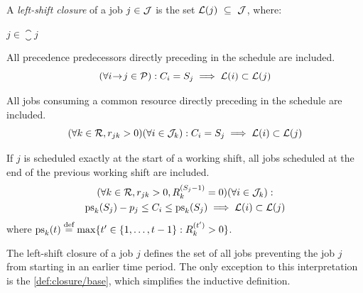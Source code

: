 \begin{defn} \label{def:left-shift-closure}
    A \emph{left-shift closure} of a job $j \in \mathcal{J}$ is the set $\mathcal{L}(j)~\subseteq~\mathcal{J}$, where:
    \begin{conditions}
        \item
            $j \in \closure{j}$ \label{def:closure/base}

        \item
            All precedence predecessors directly preceding in the schedule are included.
            $$
            (\forall i \hspace{-0.2em} \rightarrow \hspace{-0.2em} j \in \mathcal{P}):
            C_{i} = S_{j} \implies \mathcal{L}(i) \subset \mathcal{L}(j)
            $$ \label{def:closure/precedence}
            \vspace{-2em}

        \item
            All jobs consuming a common resource directly preceding in the schedule are included.
            $$
            (\forall k \in \mathcal{R}, r_{j k} > 0)
            (\forall i \in \mathcal{J}_{k}):
            C_{i} = S_{j} \implies \mathcal{L}(i) \subset \mathcal{L}(j)
            $$ \label{def:closure/resource-precedence}
            \vspace{-2em}

        \item
            If $j$ is scheduled exactly at the start of a working shift,
            all jobs scheduled at the end of the previous working shift are included.
            \begin{multline*}
            (\forall k \in \Resources, \consumption{j}{k} > 0, \capacity{k}{\jobstart{j}-1} = 0)
            (\forall i \in \JobsOnResource{k}):
            \\
            \mathrm{ps}_k(\jobstart{j}) - \duration{j} \leq \jobend{i} \leq \mathrm{ps}_k(\jobstart{j})
            \implies \closure{i} \subset \closure{j}
            \end{multline*} \label{def:closure/shift-pause-precedence}
            where $\mathrm{ps}_k(t) \defeq \max\{t^\prime \in \intinterval{1}{t-1} : \capacity{k}{t^\prime} > 0\}$.
    \end{conditions}
\end{defn}


The left-shift closure of a job $j$ defines the set of all jobs
preventing the job $j$ from starting in an earlier time period.
The only exception to this interpretation is the \cref{def:closure/base},
which simplifies the inductive definition.

